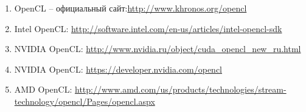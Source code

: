 {	\begin{enumerate}
		\item OpenCL -- официальный сайт:\url{http://www.khronos.org/opencl}
		\item Intel OpenCL: \url{http://software.intel.com/en-us/articles/intel-opencl-sdk}
		\item NVIDIA OpenCL: \url{http://www.nvidia.ru/object/cuda_opencl_new_ru.html}
        \item NVIDIA OpenCL: \url{https://developer.nvidia.com/opencl}
		\item AMD OpenCL: \url{http://www.amd.com/us/products/technologies/stream-technology/opencl/Pages/opencl.aspx}
	\end{enumerate}
}
